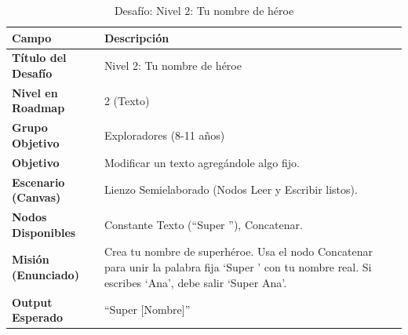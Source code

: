 \begin{table}[H]
    \centering
    \caption{Desafío: Nivel 2: Tu nombre de héroe}
    \label{tab:desafio-exp-2}
    \begingroup
    \renewcommand{\arraystretch}{\TableRowStretch}
    \begin{tabularx}{\textwidth}{ l X }
        \hline
        \textbf{Campo}              & \textbf{Descripción}                                                                                                                                   \\
        \hline
        \textbf{Título del Desafío} & Nivel 2: Tu nombre de héroe                                                                                                                            \\
        \textbf{Nivel en Roadmap}   & 2 (Texto)                                                                                                                                              \\
        \textbf{Grupo Objetivo}     & Exploradores (8-11 años)                                                                                                                               \\
        \textbf{Objetivo}           & Modificar un texto agregándole algo fijo.                                                                                                              \\
        \textbf{Escenario (Canvas)} & Lienzo Semielaborado (Nodos Leer y Escribir listos).                                                                                                   \\
        \textbf{Nodos Disponibles}  & Constante Texto (“Super ”), Concatenar.                                                                                                                \\
        \textbf{Misión (Enunciado)} & Crea tu nombre de superhéroe. Usa el nodo Concatenar para unir la palabra fija `Super ' con tu nombre real. Si escribes `Ana', debe salir `Super Ana'. \\
        \textbf{Output Esperado}    & “Super [Nombre]”                                                                                                                                       \\
        \hline
    \end{tabularx}
    \endgroup
\end{table}

